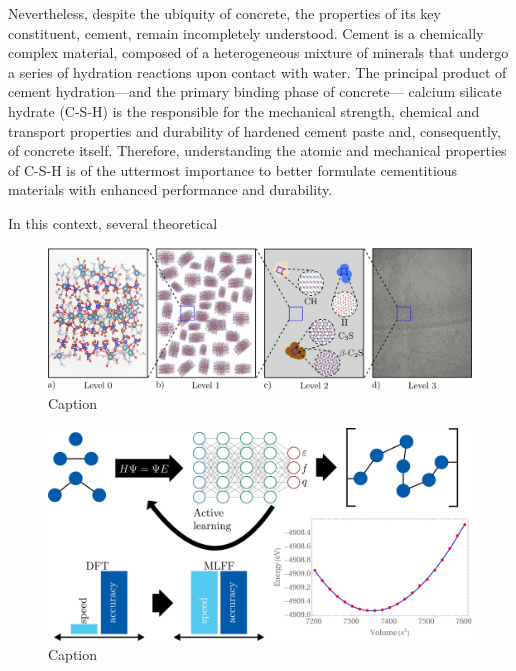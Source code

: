 \documentclass[12pt, titlepage, twoside, openright, usernames, dvipsnames]{thesis}
\theoremstyle{definition}
\theoremstyle{definition}
\begin{document}
  Nevertheless, despite the ubiquity of concrete, the properties of its key constituent, cement, remain incompletely understood. Cement is a chemically complex material, composed of a heterogeneous mixture of minerals that undergo a series of hydration reactions upon contact with water. The principal product of cement hydration---and the primary binding phase of concrete--- calcium silicate hydrate (C-S-H) is the responsible for the mechanical strength, chemical and transport properties and durability of hardened cement paste and, consequently, of concrete itself\cite{Papatzani2015, Ioannidou2016, Qomi2020, Bahraq2022}. Therefore, understanding the atomic and mechanical properties of C-S-H is of the uttermost importance to better formulate cementitious materials with enhanced performance and durability. 

In this context, several theoretical\cite{Barbhuiya2023}
  \cite{Pellenq2009}
  \cite{Oh2012}
  \cite{Li2022}
  \cite{Biernacki2017}
  \cite{Katsura2019}

  \begin{figure}[H]
    \centering
    \includegraphics[width=1\textwidth]{levels.png}
    \caption{Caption}
    \label{fig:C-S-H}
  \end{figure}


\begin{figure}[H]
  \centering
  \includegraphics[width=1\textwidth]{mlff-overview.png}
  \caption{Caption}
  \label{fig:MLFF}
\end{figure}
\end{document}
